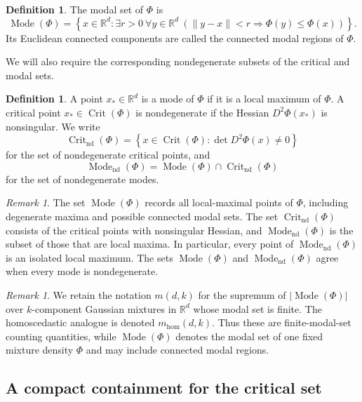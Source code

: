 \documentclass[11pt]{article}
\theoremstyle{plain}
\theoremstyle{definition}
\newtheorem{definition}[theorem]{Definition}
\theoremstyle{remark}
\newtheorem{remark}[theorem]{Remark}
\numberwithin{equation}{section}
\DeclareMathOperator{\Crit}{Crit}
\DeclareMathOperator{\Mode}{Mode}
\newcommand{\R}{\mathbb{R}}
\begin{document}
\begin{definition}
The modal set of $\Phi$ is
\[
\Mode(\Phi)=\left\{x\in\R^d:\exists r>0\ \forall y\in\R^d\ \left(\|y-x\|<r\Rightarrow \Phi(y)\le \Phi(x)\right)\right\}.
\]
Its Euclidean connected components are called the connected modal regions of $\Phi$.
\end{definition}

We will also require the corresponding nondegenerate subsets of the critical and modal sets.

\begin{definition}
A point $x_\ast\in\R^d$ is a mode of $\Phi$ if it is a local maximum of $\Phi$. A critical point $x_\ast\in\Crit(\Phi)$ is nondegenerate if the Hessian $D^2\Phi(x_\ast)$ is nonsingular. We write
\[
\Crit_{\mathrm{nd}}(\Phi)=\left\{x\in\Crit(\Phi): \det D^2\Phi(x)\neq 0\right\}
\]
for the set of nondegenerate critical points, and
\[
\Mode_{\mathrm{nd}}(\Phi)=\Mode(\Phi)\cap \Crit_{\mathrm{nd}}(\Phi)
\]
for the set of nondegenerate modes.
\end{definition}

\begin{remark}\label{rem:mode-nd}
The set $\Mode(\Phi)$ records all local-maximal points of $\Phi$, including degenerate maxima and possible connected modal sets. The set $\Crit_{\mathrm{nd}}(\Phi)$ consists of the critical points with nonsingular Hessian, and $\Mode_{\mathrm{nd}}(\Phi)$ is the subset of those that are local maxima. In particular, every point of $\Mode_{\mathrm{nd}}(\Phi)$ is an isolated local maximum. The sets $\Mode(\Phi)$ and $\Mode_{\mathrm{nd}}(\Phi)$ agree when every mode is nondegenerate.
\end{remark}

\begin{remark}\label{rem:m-vs-Mode}
We retain the notation $m(d,k)$ for the supremum of $|\Mode(\Phi)|$ over $k$-component Gaussian mixtures in $\R^d$ whose modal set is finite. The homoscedastic analogue is denoted $m_{\mathrm{hom}}(d,k)$. Thus these are finite-modal-set counting quantities, while $\Mode(\Phi)$ denotes the modal set of one fixed mixture density $\Phi$ and may include connected modal regions.
\end{remark}

\subsection{A compact containment for the critical set}\label{subsec:compact-critical}
\end{document}

